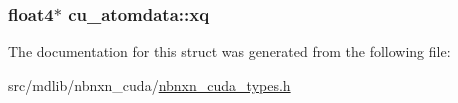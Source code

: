 \hypertarget{structcu__atomdata_af5184dc214449df1ddfbf7c1bdbea5b7}{
\subsubsection[{xq}]{\setlength{\rightskip}{0pt plus 5cm}float4$\ast$ {\bf cu\-\_\-atomdata\-::xq}}}\label{structcu__atomdata_af5184dc214449df1ddfbf7c1bdbea5b7}


\-The documentation for this struct was generated from the following file\-:\begin{DoxyCompactItemize}
\item 
src/mdlib/nbnxn\-\_\-cuda/\hyperlink{nbnxn__cuda__types_8h}{nbnxn\-\_\-cuda\-\_\-types.\-h}\end{DoxyCompactItemize}
